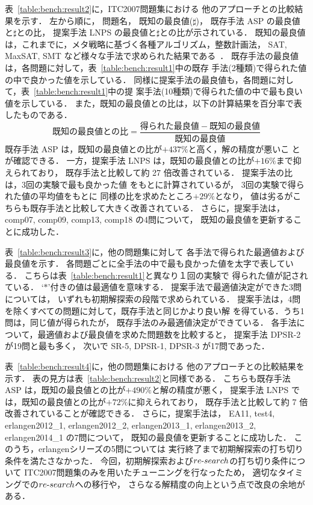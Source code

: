 表~\ref{table:bench:result2}に，ITC2007問題集における
他のアプローチとの比較結果を示す．
左から順に，
問題名，
既知の最良値($\sharp$)，
既存手法 ASP の最良値と$\sharp$との比，
提案手法 LNPS の最良値と$\sharp$との比が示されている．
既知の最良値は，これまでに，メタ戦略に基づく各種アルゴリズム，整数計画法，
SAT, MaxSAT, SMT など様々な手法で求められた結果である~\cite{anor/Banbara2019}．
既存手法の最良値は，各問題に対して，表~\ref{table:bench:result1}中の既存
手法(2種類)で得られた値の中で良かった値を示している．
同様に提案手法の最良値も，各問題に対して，表~\ref{table:bench:result1}中の提
案手法(10種類)で得られた値の中で最も良い値を示している．
また，既知の最良値との比は，以下の計算結果を百分率で表したものである．
\[
既知の最良値との比 = \frac{得られた最良値 - 既知の最良値}{既知の最良値}
\]
既存手法 ASP は，既知の最良値との比が$+437\%$と高く，解の精度が悪いこ
とが確認できる．
一方，提案手法 LNPS は，既知の最良値との比が$+16\%$まで抑えられており，
既存手法と比較して約 27 倍改善されている．
提案手法の比は，3回の実験で最も良かった値
をもとに計算されているが，
3回の実験で得られた値の平均値をもとに
同様の比を求めたところ$+29\%$となり，
値は劣るがこちらも既存手法と比較して大きく改善されている．
さらに，提案手法は，comp07, comp09, comp13, comp18 
の4問について，
既知の最良値を更新することに成功した．

表~\ref{table:bench:result3}に，他の問題集に対して
各手法で得られた最適値および最良値を示す．
各問題ごとに全手法の中で最も良かった値を太字で表している．
こちらは表~\ref{table:bench:result1}と異なり１回の実験で
得られた値が記されている．
`$\ast$'付きの値は最適値を意味する．
提案手法で最適値決定ができた3問については，
いずれも初期解探索の段階で求められている．
提案手法は，4問を除くすべての問題に対して，既存手法と同じかより良い解
を得ている．うち1問は，同じ値が得られたが，
既存手法のみ最適値決定ができている．
各手法について，最適値および最良値を求めた問題数を比較すると，
提案手法 \textsf{DPSR-2} が19問と最も多く，
次いで \textsf{SR-5, DPSR-1, DPSR-3} が17問であった．

表~\ref{table:bench:result4}に，他の問題集における
他のアプローチとの比較結果を示す．
表の見方は表~\ref{table:bench:result2}と同様である．
こちらも既存手法 ASP は，既知の最良値との比が$+490\%$と解の精度が悪く，
提案手法 LNPS では，既知の最良値との比が$+72\%$に抑えられており，
既存手法と比較して約 7 倍改善されていることが確認できる．
さらに，提案手法は，
EA11, 
test4, 
erlangen2012\_1, 
erlangen2012\_2, 
erlangen2013\_1, 
erlangen2013\_2, 
erlangen2014\_1 の7問について，
既知の最良値を更新することに成功した．
このうち，erlangenシリーズの5問については
実行終了まで初期解探索の打ち切り条件を満たさなかった．
今回，初期解探索および$re\mathchar`-search$の打ち切り条件について
ITC2007問題集のみを用いたチューニングを行なったため，
適切なタイミングでの$re\mathchar`-search$への移行や，
さらなる解精度の向上という点で改良の余地がある．

